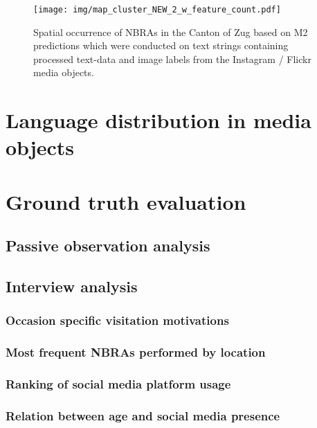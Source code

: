 \begin{figure}[h!]
   \centering
   \texttt{[image: img/map\_cluster\_NEW\_2\_w\_feature\_count.pdf]}
   \caption{Spatial occurrence of NBRAs in the Canton of Zug based on M2 predictions which were conducted on text strings containing processed text-data and image labels from the Instagram / Flickr media objects.}
   \label{fig:map_cluster_2}
\end{figure}

\section{Language distribution in media objects}


\section{Ground truth evaluation}

\subsection{Passive observation analysis}

\subsection{Interview analysis}
\subsubsection{Occasion specific visitation motivations}

\subsubsection{Most frequent NBRAs performed by location}

\subsubsection{Ranking of social media platform usage}

\subsubsection{Relation between age and social media presence}


